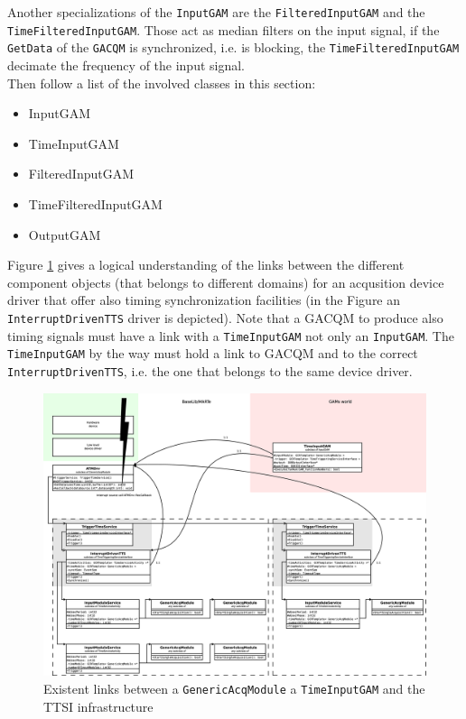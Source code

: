 Another specializations of the \texttt{InputGAM} are the \texttt{FilteredInputGAM} and the \texttt{TimeFilteredInputGAM}. Those act as median filters on the input signal, if the \texttt{GetData} of the \texttt{GACQM} is synchronized, i.e. is blocking, the \texttt{TimeFilteredInputGAM} decimate the frequency of the input signal. \\

Then follow a list of the involved classes in this section:

\begin{itemize}
 \item InputGAM
 \item TimeInputGAM
 \item FilteredInputGAM
 \item TimeFilteredInputGAM
 \item OutputGAM
\end{itemize}

Figure \ref{f:MARTe:GACQM:IOGAM:Timing} gives a logical understanding of the links between the different component objects (that belongs to different domains) for an acqusition device driver that offer also timing synchronization facilities (in the Figure an \texttt{InterruptDrivenTTS} driver is depicted). Note that a GACQM to produce also timing signals must have a link with a \texttt{TimeInputGAM} not only an \texttt{InputGAM}. The \texttt{TimeInputGAM} by the way must hold a link to GACQM and to the correct \texttt{InterruptDrivenTTS}, i.e. the one that belongs to the same device driver.

\begin{figure}[h!]
 \begin{center}
  \includegraphics[width=\textwidth]{MARTe/InterruptDrivenTTS_driver.eps}
  \caption{Existent links between a \texttt{GenericAcqModule} a \texttt{TimeInputGAM} and the TTSI infrastructure}
  \label{f:MARTe:GACQM:IOGAM:Timing}
 \end{center}
\end{figure}



